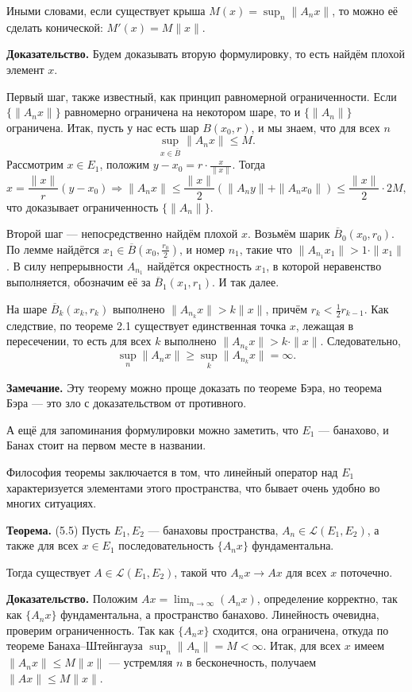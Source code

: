 Иными словами, если существует крыша $M(x) = \sup_n\|A_n x\|$, то можно её сделать конической: $M'(x) = M \|x\|$.

\textbf{Доказательство.} Будем доказывать вторую формулировку, то есть найдём плохой элемент $x$.

Первый шаг, также известный, как принцип равномерной ограниченности.
Если $\{\|A_n x\|\}$ равномерно ограничена на некотором шаре, то и $\{\|A_n\|\}$ ограничена.
Итак, пусть у нас есть шар $B(x_0, r)$, и мы знаем, что для всех $n$
\[
    \sup_{x \in \overline B}\|A_n x\| \le M.
\]
Рассмотрим $x \in E_1$, положим $y - x_0 = r \cdot \frac{x}{\|x\|}$.
Тогда
\[
    x = \frac{\|x\|}{r} (y - x_0) \Rightarrow \|A_n x\| \le \frac{\|x\|}{2} (\|A_n y\| + \|A_n x_0\|) \le \frac{\|x\|}{2} \cdot 2M,
\]
что доказывает ограниченность $\{\|A_n\|\}$.

Второй шаг --- непосредственно найдём плохой $x$.
Возьмём шарик $\overline B_0(x_0, r_0)$.
По лемме найдётся $x_1 \in \overline B(x_0, \frac{r_0}{2})$, и номер $n_1$, такие что $\|A_{n_1} x_1\| > 1 \cdot \|x_1\|$.
В силу непрерывности $A_{n_1}$ найдётся окрестность $x_1$, в которой неравенство выполняется, обозначим её за $\overline B_1(x_1, r_1)$.
И так далее.

На шаре $\overline B_k(x_k, r_k)$ выполнено $\|A_{n_k} x\| > k \|x\|$, причём $r_k < \frac{1}{2} r_{k-1}$.
Как следствие, по теореме 2.1 существует единственная точка $x$, лежащая в пересечении, то есть для всех $k$ выполнено $\|A_{n_k} x\| > k \cdot \|x\|$.
Следовательно,
\[
    \sup_n \|A_n x\| \ge \sup_k \|A_{n_k} x\| = \infty.
\]

\QED

\textbf{Замечание.} Эту теорему можно проще доказать по теореме Бэра, но теорема Бэра --- это зло с доказательством от противного.

А ещё для запоминания формулировки можно заметить, что $E_1$ --- банахово, и Банах стоит на первом месте в названии.

Философия теоремы заключается в том, что линейный оператор над $E_1$ характеризуется элементами этого пространства, что бывает очень удобно во многих ситуациях.

\textbf{Теорема.} (5.5) Пусть $E_1, E_2$ --- банаховы пространства, $A_n \in \mathcal L(E_1, E_2)$, а также для всех $x \in E_1$ последовательность $\{A_n x\}$ фундаментальна.

Тогда существует $A \in \mathcal L(E_1, E_2)$, такой что $A_n x \to Ax$ для всех $x$ поточечно.

\textbf{Доказательство.} Положим $Ax = \lim_{n \to \infty}(A_n x)$, определение корректно, так как $\{A_n x\}$ фундаментальна, а пространство банахово.
Линейность очевидна, проверим ограниченность.
Так как $\{A_n x\}$ сходится, она ограничена, откуда по теореме Банаха--Штейнгауза $\sup_n \|A_n\| = M < \infty$.
Итак, для всех $x$ имеем $\|A_n x \| \le M \|x\|$ --- устремляя $n$ в бесконечность, получаем $\|A x\| \le M \|x\|$.

